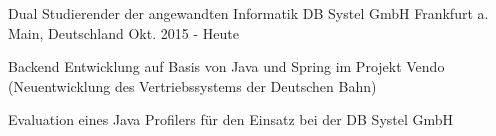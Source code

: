 

\begin{cventries}

  \cventry
    {Dual Studierender der angewandten Informatik} %
    {DB Systel GmbH} %
    {Frankfurt a. Main, Deutschland} %
    {Okt. 2015 - Heute} %
    {
      \begin{cvitems} %
        \item {Backend Entwicklung auf Basis von Java und Spring im Projekt Vendo (Neuentwicklung des Vertriebssystems der Deutschen Bahn)}
        \item {Evaluation eines Java Profilers für den Einsatz bei der DB Systel GmbH}
      \end{cvitems}
    }

\end{cventries}

